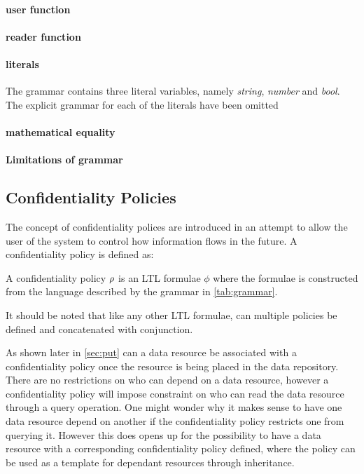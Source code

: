 \paragraph{user function}

\paragraph{reader function}


\paragraph{literals}
The grammar contains three literal variables, namely \emph{string}, \emph{number} and \emph{bool}. The explicit grammar for each of the literals have been omitted

\paragraph{mathematical equality}

\paragraph{Limitations of grammar}

\subsection{Confidentiality Policies}
The concept of confidentiality polices are introduced in an attempt to allow the user of the system to control how information flows in the future. A confidentiality policy is defined as:
\begin{definition}\label{def:cp}
A confidentiality policy $\rho$ is an LTL formulae $\phi$ where the formulae is constructed from the language described by the grammar in \autoref{tab:grammar}.
\end{definition}
It should be noted that like any other LTL formulae, can multiple policies be defined and concatenated with conjunction.

As shown later in \autoref{sec:put} can a data resource be associated with a confidentiality policy once the resource is being placed in the data repository. There are no restrictions on who can depend on a data resource, however a confidentiality policy will impose constraint on who can read the data resource through a query operation. One might wonder why it makes sense to have one data resource depend on another if the confidentiality policy restricts one from querying it. However this does opens up for the possibility to have a data resource with a corresponding confidentiality policy defined, where the policy can be used as a template for dependant resources through inheritance.

